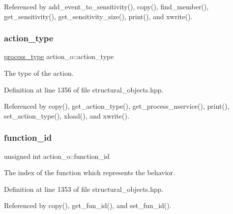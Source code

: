 Referenced by add\+\_\+event\+\_\+to\+\_\+sensitivity(), copy(), find\+\_\+member(), get\+\_\+sensitivity(), get\+\_\+sensitivity\+\_\+size(), print(), and xwrite().

\mbox{\label{classaction__o_a62f2e88f7dda12c844ca49f93fa69a8e}} 
\subsubsection{\texorpdfstring{action\+\_\+type}{action\_type}}
{\footnotesize\ttfamily \hyperlink{classaction__o_a72fdfe1ad9ac24109fe11bb41153b87b}{process\+\_\+type} action\+\_\+o\+::action\+\_\+type\hspace{0.3cm}{\ttfamily [private]}}



The type of the action. 



Definition at line 1356 of file structural\+\_\+objects.\+hpp.



Referenced by copy(), get\+\_\+action\+\_\+type(), get\+\_\+process\+\_\+nservice(), print(), set\+\_\+action\+\_\+type(), xload(), and xwrite().

\mbox{\label{classaction__o_aed844c704d43453d4e0127a30a4ace6d}} 
\subsubsection{\texorpdfstring{function\+\_\+id}{function\_id}}
{\footnotesize\ttfamily unsigned int action\+\_\+o\+::function\+\_\+id\hspace{0.3cm}{\ttfamily [private]}}



The index of the function which represents the behavior. 



Definition at line 1353 of file structural\+\_\+objects.\+hpp.



Referenced by copy(), get\+\_\+fun\+\_\+id(), and set\+\_\+fun\+\_\+id().

\mbox{\label{classaction__o_a21d0c290c96e2a32d64ba56432fb1205}} 
